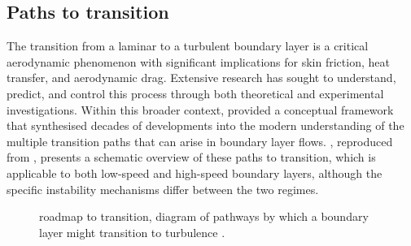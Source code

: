 \subsection{Paths to transition}

The transition from a laminar to a turbulent boundary layer is a critical aerodynamic phenomenon with significant implications for skin friction, heat transfer, and aerodynamic drag. Extensive research has sought to understand, predict, and control this process through both theoretical and experimental investigations. Within this broader context, \citet{Morkovin1994} provided a conceptual framework that synthesised decades of developments into the modern understanding of the multiple transition paths that can arise in boundary layer flows. , reproduced from \citet{Fedorov2011}, presents a schematic overview of these paths to transition, which is applicable to both low-speed and high-speed boundary layers, although the specific instability mechanisms differ between the two regimes.


\begin{figure}[hbt!]
    \centering
    \fontsize{9}{10}\selectfont
    \caption{\cite{Morkovin1994} roadmap to transition, diagram of pathways by which a boundary layer might transition to turbulence \citep{Fedorov2011}.}
    \label{figure:transitionmarkovin}
\end{figure}




